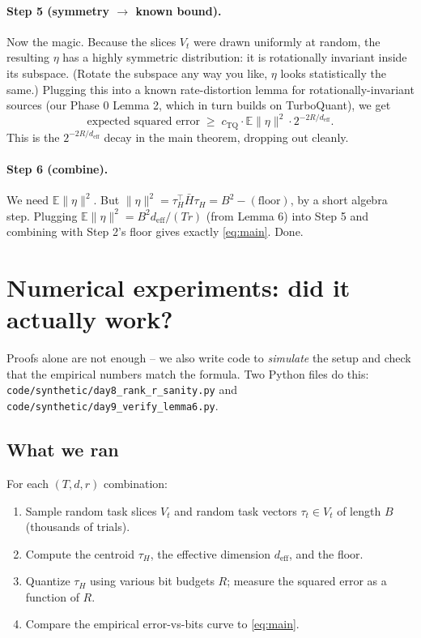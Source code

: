 \documentclass[11pt]{article}
\newcommand{\E}{\mathbb{E}}
\newcommand{\tauH}{\tau_{\!H}}
\newcommand{\deff}{d_{\mathrm{eff}}}
\newcommand{\Hbar}{\bar H}
\begin{document}
\paragraph{Step 5 (symmetry $\to$ known bound).} Now the magic.
Because the slices $V_t$ were drawn uniformly at random, the resulting
$\eta$ has a highly symmetric distribution: it is rotationally
invariant inside its subspace. (Rotate the subspace any way you like,
$\eta$ looks statistically the same.) Plugging this into a known
rate-distortion lemma for rotationally-invariant sources (our Phase 0
Lemma 2, which in turn builds on TurboQuant), we get
\[
  \text{expected squared error}
  \;\geq\;
  c_{\mathrm{TQ}}\cdot\E\|\eta\|^2\cdot 2^{-2R/\deff}.
\]
This is the $2^{-2R/\deff}$ decay in the main theorem, dropping out
cleanly.

\paragraph{Step 6 (combine).} We need $\E\|\eta\|^2$. But
$\|\eta\|^2 = \tauH^\top\Hbar\tauH = B^2 - (\text{floor})$, by a short
algebra step. Plugging $\E\|\eta\|^2 = B^2\deff/(Tr)$ (from Lemma 6)
into Step 5 and combining with Step 2's floor gives exactly
\eqref{eq:main}. Done.

\section{Numerical experiments: did it actually work?}\label{sec:numerics}

Proofs alone are not enough -- we also write code to \emph{simulate}
the setup and check that the empirical numbers match the formula. Two
Python files do this:
\texttt{code/synthetic/day8\_rank\_r\_sanity.py} and
\texttt{code/synthetic/day9\_verify\_lemma6.py}.

\subsection{What we ran}

For each $(T, d, r)$ combination:
\begin{enumerate}[nosep]
  \item Sample random task slices $V_t$ and random task vectors
        $\tau_t \in V_t$ of length $B$ (thousands of trials).
  \item Compute the centroid $\tauH$, the effective dimension $\deff$,
        and the floor.
  \item Quantize $\tauH$ using various bit budgets $R$; measure the
        squared error as a function of $R$.
  \item Compare the empirical error-vs-bits curve to
        \eqref{eq:main}.
\end{enumerate}
\end{document}
